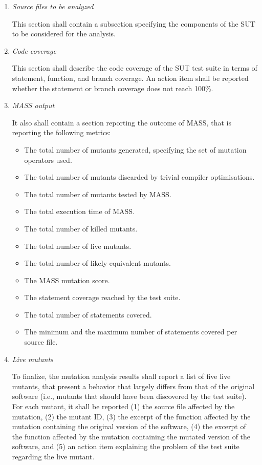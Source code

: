 \begin{enumerate}
    \item \emph{Source files to be analyzed}

    This section shall contain a subsection specifying the components of the SUT to be considered for the analysis.

    \item \emph{Code coverage}

    This section shall describe the code coverage of the SUT test suite in terms of statement, function, and branch coverage. An action item shall be reported whether the statement or branch coverage does not reach 100\%.

    \item \emph{MASS output}

    It also shall contain a section reporting the outcome of MASS, that is reporting the following metrics:
    \begin{itemize}
        \item The total number of mutants generated, specifying the set of mutation operators used.
        \item The total number of mutants discarded by trivial compiler optimisations.
        \item The total number of mutants tested by MASS.
        \item The total execution time of MASS.
        \item The total number of killed mutants.
        \item The total number of live mutants.
        \item The total number of likely equivalent mutants.
        \item The MASS mutation score.
        \item The statement coverage reached by the test suite.
        \item The total number of statements covered.
        \item The minimum and the maximum number of statements covered per source file.
    \end{itemize}


    \item \emph{Live mutants}

    To finalize, the mutation analysis results shall report a list of five live mutants, that present a behavior that largely differs from that of the original software (i.e., mutants that should have been discovered by the test suite). For each mutant, it shall be reported (1) the source file affected by the mutation, (2) the mutant ID, (3) the excerpt of the function affected by the mutation containing the original version of the software, (4) the excerpt of the function affected by the mutation containing the mutated version of the software, and (5) an action item explaining the problem of the test suite regarding the live mutant.
\end{enumerate}





